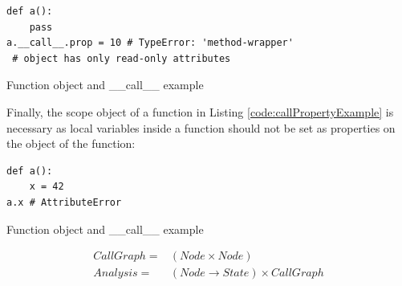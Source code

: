 \begin{listing}[H]
	\begin{verbatim}
def a(): 
	pass
a.__call__.prop = 10 # TypeError: 'method-wrapper' 
 # object has only read-only attributes
	\end{verbatim}
\caption{Function object and \_\_call\_\_ example}\label{code:callPropertyExample}
\end{listing}
Finally, the scope object of a function in Listing \ref{code:callPropertyExample} is necessary as local variables inside a function should not be set as properties on the object of the function:
\begin{listing}[H]
	\begin{verbatim}
def a(): 
	x = 42
a.x # AttributeError
	\end{verbatim}
\caption{Function object and \_\_call\_\_ example}\label{code:callPropertyExample}
\end{listing}
\begin{eqnarray*}
CallGraph =& (Node \times Node) \\
Analysis =& (Node \rightarrow State) \times CallGraph
\end{eqnarray*}



